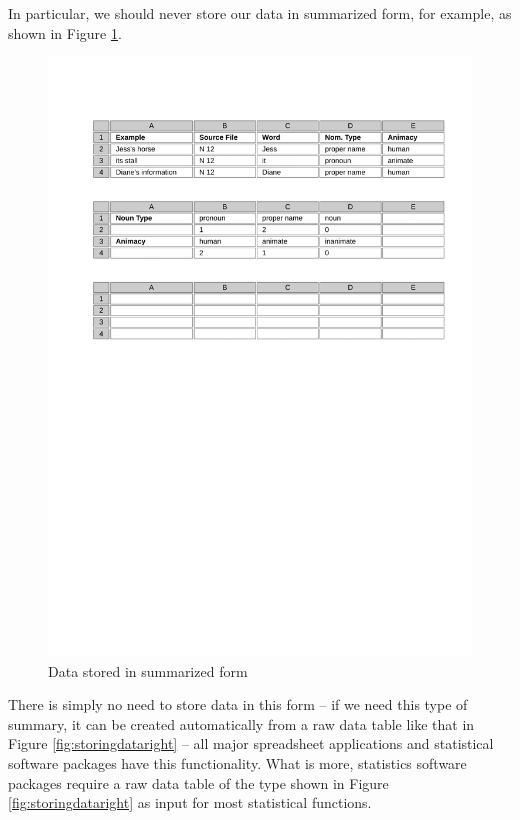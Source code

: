 In particular, we should never store our data in summarized form, for example, as shown in Figure \ref{fig:storingdatawrong}.

\begin{figure}[!htbp]
\caption{Data stored in summarized form}
\label{fig:storingdatawrong}
\includegraphics[width=\textwidth,keepaspectratio]{figures/storingdatawrong}
\end{figure}

There is simply no need to store data in this form -- if we need this type of summary, it can be created automatically from a raw data table like that in Figure \ref{fig:storingdataright} -- all major spreadsheet applications and statistical software packages have this functionality. What is more, statistics software packages require a raw data table of the type shown in Figure \ref{fig:storingdataright} as input for most statistical functions.

